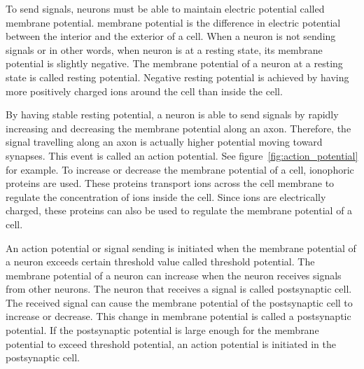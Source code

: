 To send signals, \glspl{neuron} must be able to maintain electric potential called \gls{membrane potential}. \Gls{membrane potential} is the difference in electric potential between the interior and the exterior of a cell. When a \gls{neuron} is not sending signals or in other words, when neuron is at a \gls{resting state}, its \gls{membrane potential} is slightly negative. The \gls{membrane potential} of a \gls{neuron} at a \gls{resting state} is called \gls{resting potential}. Negative \gls{resting potential} is achieved by having more positively charged ions around the cell than inside the cell.

By having stable \gls{resting potential}, a \gls{neuron} is able to send signals by rapidly increasing and decreasing the \gls{membrane potential} along an \gls{axon}. Therefore, the signal travelling along an \gls{axon} is actually higher potential moving toward \glspl{synapse}. This event is called an \gls{action potential}. See figure~\ref{fig:action_potential} for example. To increase or decrease the \gls{membrane potential} of a cell, \glspl{ionophoric protein} are used. These proteins transport ions across the cell membrane to regulate the concentration of ions inside the cell. Since ions are electrically charged, these proteins can also be used to regulate the \gls{membrane potential} of a cell.

An \gls{action potential} or signal sending is initiated when the \gls{membrane potential} of a \gls{neuron} exceeds certain threshold value called \gls{threshold potential}. The \gls{membrane potential} of a \gls{neuron} can increase when the \gls{neuron} receives signals from other \glspl{neuron}. The \gls{neuron} that receives a signal is called \gls{postsynaptic cell}. The received signal can cause the \gls{membrane potential} of the \gls{postsynaptic cell} to increase or decrease. This change in \gls{membrane potential} is called a \gls{postsynaptic potential}. If the \gls{postsynaptic potential} is large enough for the \gls{membrane potential} to exceed \gls{threshold potential}, an \gls{action potential} is initiated in the \gls{postsynaptic cell}.

